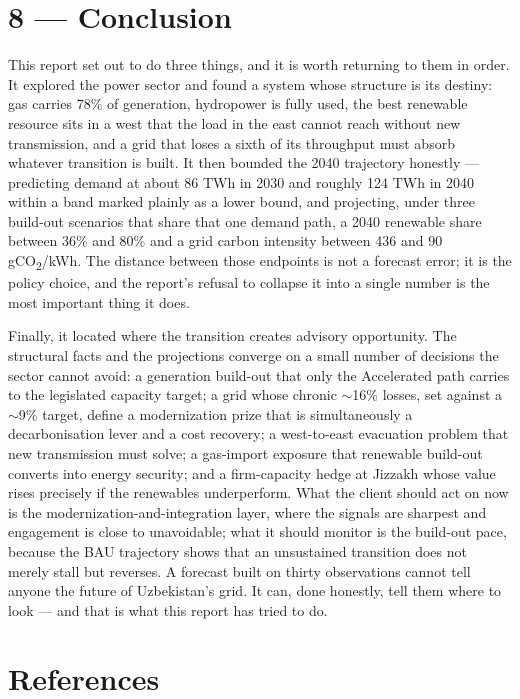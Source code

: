 \documentclass[10pt,twocolumn]{article}
\begin{document}
\section*{8 --- Conclusion}

This report set out to do three things, and it is worth returning to them in order. It explored the power sector and found a system whose structure is its destiny: gas carries 78\% of generation, hydropower is fully used, the best renewable resource sits in a west that the load in the east cannot reach without new transmission, and a grid that loses a sixth of its throughput must absorb whatever transition is built. It then bounded the 2040 trajectory honestly --- predicting demand at about 86 TWh in 2030 and roughly 124 TWh in 2040 within a band marked plainly as a lower bound, and projecting, under three build-out scenarios that share that one demand path, a 2040 renewable share between 36\% and 80\% and a grid carbon intensity between 436 and 90 gCO\textsubscript{2}/kWh. The distance between those endpoints is not a forecast error; it is the policy choice, and the report's refusal to collapse it into a single number is the most important thing it does.

Finally, it located where the transition creates advisory opportunity. The structural facts and the projections converge on a small number of decisions the sector cannot avoid: a generation build-out that only the Accelerated path carries to the legislated capacity target; a grid whose chronic $\sim$16\% losses, set against a $\sim$9\% target, define a modernization prize that is simultaneously a decarbonisation lever and a cost recovery; a west-to-east evacuation problem that new transmission must solve; a gas-import exposure that renewable build-out converts into energy security; and a firm-capacity hedge at Jizzakh whose value rises precisely if the renewables underperform. What the client should act on now is the modernization-and-integration layer, where the signals are sharpest and engagement is close to unavoidable; what it should monitor is the build-out pace, because the BAU trajectory shows that an unsustained transition does not merely stall but reverses. A forecast built on thirty observations cannot tell anyone the future of Uzbekistan's grid. It can, done honestly, tell them where to look --- and that is what this report has tried to do.

\section*{References}
\end{document}

